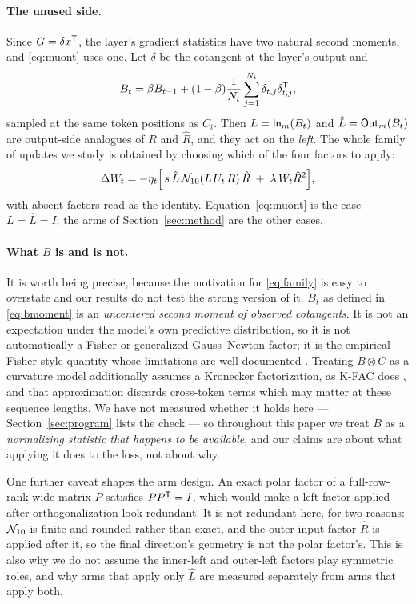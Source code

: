\paragraph{The unused side.}
Since $G=\delta x^{{\mathsf T}}$, the layer's gradient statistics have two natural
second moments, and \eqref{eq:muont} uses one. Let $\delta$ be the cotangent at
the layer's output and
\begin{equation}
\label{eq:bmoment}
B_t=\beta B_{t-1}+(1-\beta)\frac{1}{N_t}\sum_{j=1}^{N_t}\delta_{t,j}\delta_{t,j}^{{\mathsf T}},
\end{equation}
sampled at the same token positions as $C_t$. Then $L=\mathsf{In}_m(B_t)$ and
$\hat L=\mathsf{Out}_m(B_t)$ are output-side analogues of $R$ and $\hat R$, and they act
on the \emph{left}. The whole family of updates we study is obtained by
choosing which of the four factors to apply:
\begin{equation}
\label{eq:family}
\Delta W_t=-\eta_t\Bigl[\,s\,\hat L\,\mathcal{N}_{10}\!\left(L\,U_t\,R\right)\hat R
\;+\;\lambda\,W_t\hat R^{2}\Bigr],
\end{equation}
with absent factors read as the identity. Equation~\eqref{eq:muont} is the case
$L=\hat L=I$; the arms of Section~\ref{sec:method} are the other cases.

\paragraph{What $B$ is and is not.}
It is worth being precise, because the motivation for \eqref{eq:family} is
easy to overstate and our results do not test the strong version of it. $B_t$ as
defined in \eqref{eq:bmoment} is an \emph{uncentered second moment of observed
cotangents}. It is not an expectation under the model's own predictive
distribution, so it is not automatically a Fisher or
generalized Gauss--Newton factor; it is the empirical-Fisher-style quantity
whose limitations are well documented \citep{kunstner2019limitations}. Treating
$B\otimes C$ as a curvature model additionally assumes a Kronecker
factorization, as K-FAC does \citep{martens2015kfac}, and that approximation
discards cross-token terms which may matter at these sequence lengths. We have
not measured whether it holds here --- Section~\ref{sec:program} lists the
check --- so throughout this paper we treat $B$ as a \emph{normalizing
statistic that happens to be available}, and our claims are about what
applying it does to the loss, not about why.

One further caveat shapes the arm design. An exact polar factor of a
full-row-rank wide matrix $P$ satisfies $PP^{{\mathsf T}}=I$, which would make a left
factor applied after orthogonalization look redundant. It is not redundant
here, for two reasons: $\mathcal{N}_{10}$ is finite and rounded rather than exact, and the
outer input factor $\hat R$ is applied after it, so the final direction's
geometry is not the polar factor's. This is also why we do not assume the
inner-left and outer-left factors play symmetric roles, and why arms that apply
only $\hat L$ are measured separately from arms that apply both.


